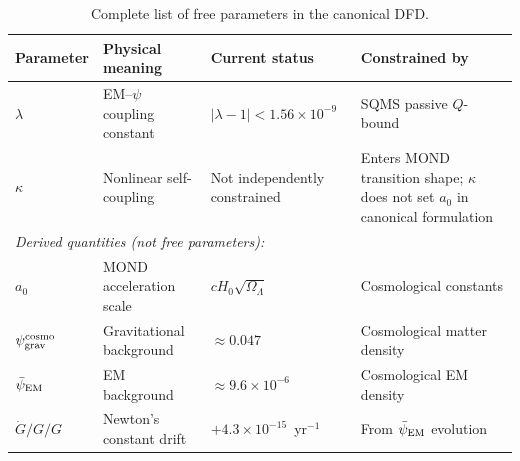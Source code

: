 \documentclass[11pt]{article}
\newcommand{\ee}[1]{\times 10^{#1}}
\newcommand{\psigrav}{\psi_{\rm grav}}
\newcommand{\psiEM}{\bar{\psi}_{\rm EM}}
\newcommand{\Gdot}{\dot{G}/G}
\newcommand{\aM}{a_0}
\newcommand{\Hzero}{H_0}
\newcommand{\lamdiff}{|\lambda{-}1|}
\newcommand{\lambdabound}{1.56\ee{-9}}
\begin{document}
\begin{table}[H]
\centering
\caption{Complete list of free parameters in the canonical DFD.}
\label{tab:parameters}
\begin{tabular}{lp{5cm}lp{3cm}}
\toprule
\textbf{Parameter} & \textbf{Physical meaning} & \textbf{Current status} & \textbf{Constrained by} \\
\midrule
$\lambda$ & EM--$\psi$ coupling constant & $\lamdiff < \lambdabound$ & SQMS passive $Q$-bound \\
$\kappa$ & Nonlinear self-coupling & Not independently constrained &
  Enters MOND transition shape; $\kappa$ does not set $\aM$ in canonical
  formulation \\
\midrule
\multicolumn{4}{l}{\textit{Derived quantities (not free parameters):}} \\
$\aM$ & MOND acceleration scale & $c\Hzero\sqrt{\Omega_\Lambda}$ & Cosmological constants \\
$\psigrav^{\rm cosmo}$ & Gravitational background & $\approx 0.047$ & Cosmological matter density \\
$\psiEM$ & EM background & $\approx 9.6\ee{-6}$ & Cosmological EM density \\
$\Gdot/G$ & Newton's constant drift & $+4.3\ee{-15}$~yr$^{-1}$ & From $\psiEM$ evolution \\
\bottomrule
\end{tabular}
\end{table}
\end{document}
